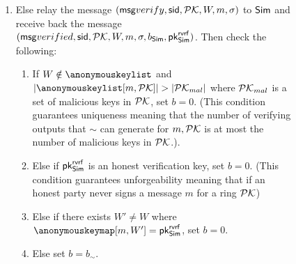 \begin{figure}
\begin{tcolorbox}
{\begin{description}
\begin{enumerate}[label={{Cond.-} }{{\arabic*}}, start = 1]
				\item \label{cond:malicioussignature}Else relay the message $(\mathsf{msg}{verify}, \textsf{sid}, {\mathcal{PK}},W, m, \sigma)$ to $ \mathsf{Sim} $ and receive back the message $(\mathsf{msg}{verified}, \textsf{sid}, {\mathcal{PK}},W, m, \sigma, b_{\mathsf{Sim}}, \mathsf{pk}^{\mathsf{rvrf}}_{\mathsf{Sim}})$.  Then check the following:
				\begin{enumerate}
					\item If $ W \notin \anonymouskeylist $ and $ |\anonymouskeylist[m, \pkring]| > |\pkring_{mal}| $ where $ {\mathcal{PK}}_{mal} $ is a set of malicious keys in $ {\mathcal{PK}} $, set $ b = 0 $.
					(This condition guarantees  uniqueness meaning that the number of verifying outputs that $ \sim $ can generate for $ m, {\mathcal{PK}} $ is at most the  number of malicious keys in $ {\mathcal{PK}} $.)\label{cond:uniqueness}.
					
					\item Else if $ \mathsf{pk}^{\mathsf{rvrf}}_{\mathsf{Sim}} $ is an honest verification key, set $ b = 0 $. (This condition guarantees unforgeability meaning that if an honest party never signs a message $ m $ for a ring $ {\mathcal{PK}} $)\label{cond:forgery}
					
					\item Else if there exists $ W' \neq W $ where  $ \anonymouskeymap[m,W'] = \pkrvrf_\simulator $, set $ b = 0 $. \label{cond:differentWforsamepk}
					\item Else set $ b = b_\sim$. \label{cond:simulatorbit}
				\end{enumerate}		
				

\end{enumerate}
\end{description}}
\end{tcolorbox}
\end{figure}
